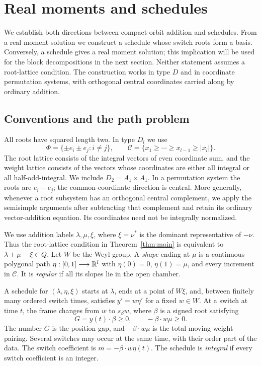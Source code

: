 \section{Real moments and schedules}\label{sec:real-schedules}

We establish both directions between compact-orbit addition and
schedules.  From a real moment solution we construct a schedule whose
switch roots form a basis.  Conversely, a schedule gives a real moment
solution; this implication will be used for the block decompositions
in the next section.  Neither statement assumes a root-lattice
condition.  The construction works in type $D$ and in coordinate
permutation systems, with orthogonal central coordinates carried along
by ordinary addition.

\subsection{Conventions and the path problem}

All roots have squared length two.  In type $D_l$ we use
\[
 \Phi=\{\pm e_i\pm e_j:i\ne j\},\qquad
 \mathcal C=\{x_1\ge\cdots\ge x_{l-1}\ge |x_l|\}.
\]
The root lattice consists of the integral vectors of even coordinate
sum, and the weight lattice consists of the vectors whose coordinates
are either all integral or all half-odd-integral.  We include
$D_2=A_1\times A_1$.  In a permutation system the roots are $e_i-e_j$;
the common-coordinate direction is central.  More generally, whenever
a root subsystem has an orthogonal central complement, we apply the
semisimple arguments after subtracting that complement and retain its
ordinary vector-addition equation.  Its coordinates need not be
integrally normalized.

We use addition labels $\lambda,\mu,\xi$, where $\xi=\nu^*$ is the
dominant representative of $-\nu$.  Thus the root-lattice condition in
Theorem~\ref{thm:main} is equivalent to
$\lambda+\mu-\xi\in Q$.  Let $W$ be the Weyl group.  A \emph{shape}
ending at $\mu$ is a continuous polygonal path
$\eta:[0,1]\longrightarrow\mathbb R^l$ with $\eta(0)=0$, $\eta(1)=\mu$,
and every increment in $\mathcal C$.  It is \emph{regular} if all its
slopes lie in the open chamber.

\begin{definition}[Schedule]\label{def:schedule}
A schedule for $(\lambda,\eta,\xi)$ starts at $\lambda$, ends at a
point of $W\xi$, and, between finitely many ordered switch times,
satisfies $y'=w\eta'$ for a fixed $w\in W$.  At a switch at time $t$,
the frame changes from $w$ to $s_\beta w$, where $\beta$ is a signed
root satisfying
\begin{equation}\label{real:signs}
 G=y(t)\cdot\beta\ge0,
 \qquad -\beta\cdot w\mu\ge0.
\end{equation}
The number $G$ is the position gap, and $-\beta\cdot w\mu$ is the
total moving-weight pairing.  Several switches may occur at the same
time, with their order part of the data.  The switch coefficient is
$m=-\beta\cdot w\eta(t)$.  The schedule is \emph{integral} if every
switch coefficient is an integer.
\end{definition}

